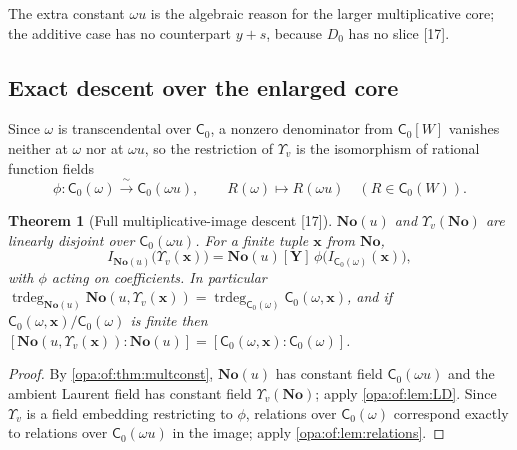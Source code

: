 \documentclass[11pt,oneside]{article}
\numberwithin{equation}{section}
\newtheorem{theorem}{Theorem}[section]
\theoremstyle{definition}
\theoremstyle{remark}
\newcommand{\No}{\mathbf{No}}
\newcommand{\trdeg}{\operatorname{trdeg}}
\newcommand{\src}[1]{\textup{\textsf{\small[#1]}}}
\begin{document}
The extra constant $\omega u$ is the algebraic reason for the larger multiplicative core; the additive case has no counterpart
$y+s$, because $D_0$ has no slice \src{17}.

\subsection{Exact descent over the enlarged core}

Since $\omega$ is transcendental over $\mathsf C_0$, a nonzero denominator from $\mathsf C_0[W]$ vanishes neither at $\omega$ nor at
$\omega u$, so the restriction of $\Upsilon_v$ is the isomorphism of rational function fields
\begin{equation}\label{opa:of:eq:baseiso}
 \phi:\mathsf C_0(\omega)\xrightarrow{\ \sim\ }\mathsf C_0(\omega u),\qquad R(\omega)\longmapsto R(\omega u)\quad(R\in\mathsf C_0(W)).
\end{equation}

\begin{theorem}[Full multiplicative-image descent \src{17}]\label{opa:of:thm:multdescent}
$\No(u)$ and $\Upsilon_v(\No)$ are linearly disjoint over $\mathsf C_0(\omega u)$. For a finite tuple $\mathbf x$ from $\No$,
\begin{equation}\label{opa:of:eq:multideal}
 I_{\No(u)}\bigl(\Upsilon_v(\mathbf x)\bigr)=\No(u)[\mathbf Y]\,\phi\bigl(I_{\mathsf C_0(\omega)}(\mathbf x)\bigr),
\end{equation}
with $\phi$ acting on coefficients. In particular
$\trdeg_{\No(u)}\No(u,\Upsilon_v(\mathbf x))=\trdeg_{\mathsf C_0(\omega)}\mathsf C_0(\omega,\mathbf x)$, and if
$\mathsf C_0(\omega,\mathbf x)/\mathsf C_0(\omega)$ is finite then
$[\No(u,\Upsilon_v(\mathbf x)):\No(u)]=[\mathsf C_0(\omega,\mathbf x):\mathsf C_0(\omega)]$.
\end{theorem}
\begin{proof}
By \cref{opa:of:thm:multconst}, $\No(u)$ has constant field $\mathsf C_0(\omega u)$ and the ambient Laurent field has constant field
$\Upsilon_v(\No)$; apply \cref{opa:of:lem:LD}. Since $\Upsilon_v$ is a field embedding restricting to $\phi$, relations over
$\mathsf C_0(\omega)$ correspond exactly to relations over $\mathsf C_0(\omega u)$ in the image; apply \cref{opa:of:lem:relations}.
\end{proof}
\end{document}
